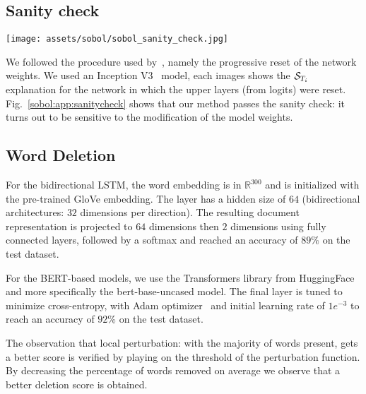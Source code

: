 \subsection{Sanity check}

\begin{figure*}[ht]
    \centering
    \texttt{[image: assets/sobol/sobol\_sanity\_check.jpg]}
    \caption{\textbf{Sanity Check} model weights are progressively reinitialized from Mixed 6 to Mixed 1 in InceptionV3~\cite{szegedy2015going}, demonstrating our method’s sensitivity to model weights.}
    \label{sobol:app:sanitycheck}
\end{figure*}

We followed the procedure used by~\cite{adebayo2018sanity}, namely the progressive reset of the network weights. We used an Inception V3~\cite{szegedy2015going} model, each images shows the $\mathcal{S}_{T_i}$ explanation for the network in which the upper layers (from logits) were reset. 
Fig.~\ref{sobol:app:sanitycheck} shows that our method passes the sanity check: it turns out to be sensitive to the modification of the model weights. 


\subsection{Word Deletion}
\label{sobol:app:word_deletion}

For the bidirectional LSTM, the word embedding is in $\mathbb{R}^{300}$ and is initialized with the pre-trained GloVe embedding. The layer has a hidden size of $64$ (bidirectional architectures: $32$ dimensions per direction). The resulting document representation is projected to $64$ dimensions then $2$ dimensions using fully connected layers, followed by a softmax and reached an accuracy of $89\%$ on the test dataset.

For the BERT-based models, we use the Transformers library from HuggingFace~\cite{wolf2020transformers}
and more specifically the bert-base-uncased model.
The final layer is tuned to minimize cross-entropy,
 with Adam optimizer~\cite{kingma2014adam}
and initial learning rate of $1e^{-3}$
to reach an accuracy of $92$\% on the test dataset.

The observation that local perturbation: with the majority of words present, gets a better score is verified by playing on the threshold of the perturbation function. By decreasing the percentage of words removed on average we observe that a better deletion score is obtained.

